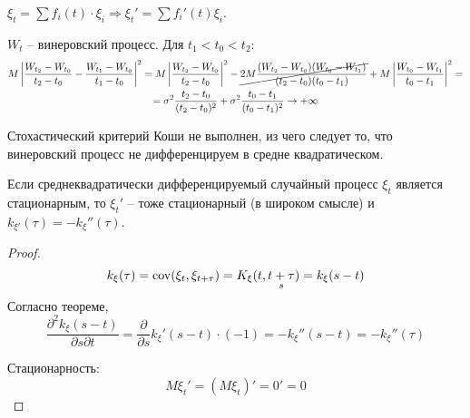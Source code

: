 \begin{remark}
  $\xi_t = \sum f_i (t) \cdot \xi_i \Rightarrow \xi_t ' = \sum f_i'(t) \xi_i$.
\end{remark}

\begin{ex}
  $W_t$ -- винеровский процесс. Для $t_1 < t_0 < t_2$:
  \begin{multline*}
    M\left| \dfrac{W_{t_2} - W_{t_0}}{t_2 - t_0} - \dfrac{W_{t_1} - W_{t_0}}{t_1 - t_0} \right|^2 
    = M \left| \dfrac{W_{t_2} - W_{t_0}}{t_2 - t_0} \right|^2 - \cancel{2 M \dfrac{(W_{t_2} - W_{t_0})(W_{t_0} - W_{t_1})}{(t_2 - t_0)(t_0-t_1)} } + M \left| \dfrac{W_{t_0} - W_{t_1}}{t_0 - t_1} \right|^2 = \\
    = \sigma^2 \dfrac{t_2-t_0}{(t_2-t_0)^2} + \sigma^2 \dfrac{t_0 - t_1}{(t_0-t_1)^2} \to +\infty
  \end{multline*}

  Стохастический критерий Коши не выполнен, из чего следует то, что винеровский процесс не дифференцируем в средне квадратическом.
\end{ex}

\begin{corollary}
  Если среднеквадратически дифференцируемый случайный процесс $\xi_t$ является стационарным,
то $\xi_t'$ -- тоже стационарный (в широком смысле) и $k_{\xi'} (\tau) = - k_\xi''(\tau)$.
\end{corollary}
\begin{proof}
  \[
    k_\xi (\tau) = \operatorname{cov}(\xi_t, \xi_{t+\tau}) = K_\xi(t, \underset{s}{t+\tau}) = k_\xi(s-t)
  \]
  Согласно теореме, 
  \[
    \dfrac{\partial^2 k_\xi(s-t)}{\partial s \partial t} = \dfrac{\partial }{\partial s} k_\xi'(s-t) \cdot (-1) = - k_\xi''(s-t) = - k_\xi''(\tau)
  \]

  Стационарность:
  \[
    M\xi_t' = (M\xi_t)' = 0' = 0
  \]
\end{proof}

